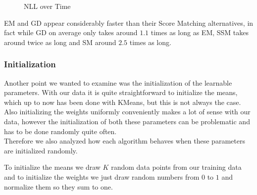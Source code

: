 \begin{figure}[H]
    \centering
    \caption{NLL over Time}
    \label{fig:spirals_30_kmeans}
\end{figure}

EM and GD appear considerably faster than their Score Matching alternatives, in fact while GD on average only takes 
around $1.1$ times as long as EM, SSM takes around twice as long and SM around $2.5$ times as long.

\subsubsection{Initialization}
\label{sec:2d_exp3}

Another point we wanted to examine was the initialization of the learnable parameters. 
With our data it is quite straightforward to initialize the means, which up to now has been done with KMeans, but this is not always the case.
Also initializing the weights uniformly conveniently makes a lot of sense with our data, however the initialization of both these 
parameters can be problematic and has to be done randomly quite often. \\
Therefore we also analyzed how each algorithm 
behaves when these parameters are initialized randomly. 

To initialize the means we draw $K$ random data points from our training data and 
to initialize the weights we just draw random numbers from $0$ to $1$ and normalize them so they sum to one.

